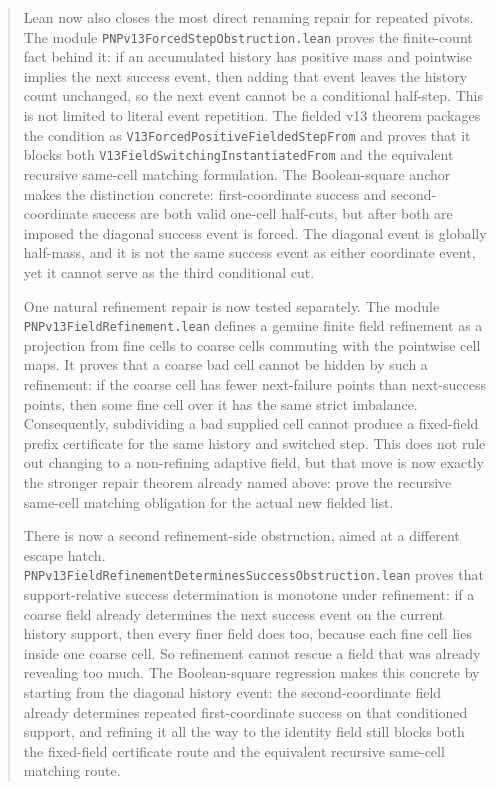 \documentclass[11pt]{article}
\theoremstyle{remark}
\begin{document}
\begin{abstract}
Lean now also closes the most direct renaming repair for repeated pivots.  The module
\texttt{PNPv13ForcedStepObstruction.lean} proves the finite-count fact behind it: if an
accumulated history has positive mass and pointwise implies the next success event, then adding
that event leaves the history count unchanged, so the next event cannot be a conditional half-step.
This is not limited to literal event repetition.  The fielded v13 theorem packages the condition
as \texttt{V13ForcedPositiveFieldedStepFrom} and proves that it blocks both
\texttt{V13FieldSwitchingInstantiatedFrom} and the equivalent recursive same-cell matching
formulation.  The Boolean-square anchor makes the distinction concrete: first-coordinate success
and second-coordinate success are both valid one-cell half-cuts, but after both are imposed the
diagonal success event is forced.  The diagonal event is globally half-mass, and it is not the same
success event as either coordinate event, yet it cannot serve as the third conditional cut.

One natural refinement repair is now tested separately.  The module
\texttt{PNPv13FieldRefinement.lean} defines a genuine finite field refinement as a projection from
fine cells to coarse cells commuting with the pointwise cell maps.  It proves that a coarse bad cell
cannot be hidden by such a refinement: if the coarse cell has fewer next-failure points than
next-success points, then some fine cell over it has the same strict imbalance.  Consequently,
subdividing a bad supplied cell cannot produce a fixed-field prefix certificate for the same
history and switched step.  This does not rule out changing to a non-refining adaptive field, but
that move is now exactly the stronger repair theorem already named above: prove the recursive
same-cell matching obligation for the actual new fielded list.

There is now a second refinement-side obstruction, aimed at a different escape
hatch.  \texttt{PNPv13FieldRefinementDeterminesSuccessObstruction.lean} proves that
support-relative success determination is monotone under refinement: if a coarse
field already determines the next success event on the current history support,
then every finer field does too, because each fine cell lies inside one coarse
cell.  So refinement cannot rescue a field that was already revealing too much.
The Boolean-square regression makes this concrete by starting from the diagonal
history event: the second-coordinate field already determines repeated
first-coordinate success on that conditioned support, and refining it all the
way to the identity field still blocks both the fixed-field certificate route
and the equivalent recursive same-cell matching route.


\end{abstract}
\end{document}
